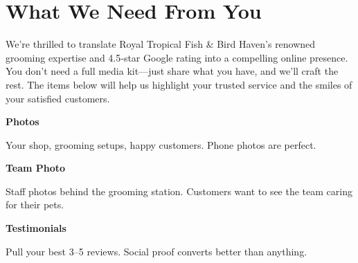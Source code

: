 \documentclass[11pt,letterpaper]{article}
\begin{document}
\vspace{0.2em}

\section*{What We Need From You}

We’re thrilled to translate Royal Tropical Fish \& Bird Haven’s renowned grooming expertise and 4.5‑star Google rating into a compelling online presence. You don’t need a full media kit—just share what you have, and we’ll craft the rest. The items below will help us highlight your trusted service and the smiles of your satisfied customers.

\vspace{0.12em}

\noindent\begin{minipage}[t]{0.48\textwidth}
\begin{tcolorbox}[colframe=accent-teal, boxrule=1pt, left=0.7em, right=0.7em, top=0.5em, bottom=0.5em, arc=4pt, boxsep=0pt]
{\bfseries\small\color{accent-teal}Photos}

\vspace{0.15em}

{\small Your shop, grooming setups, happy customers. Phone photos are perfect.}
\end{tcolorbox}

\vspace{0.1em}

\begin{tcolorbox}[colframe=accent-teal, boxrule=1pt, left=0.7em, right=0.7em, top=0.5em, bottom=0.5em, arc=4pt, boxsep=0pt]
{\bfseries\small\color{accent-teal}Team Photo}

\vspace{0.15em}

{\small Staff photos behind the grooming station. Customers want to see the team caring for their pets.}
\end{tcolorbox}

\vspace{0.1em}

\begin{tcolorbox}[colframe=accent-teal, boxrule=1pt, left=0.7em, right=0.7em, top=0.5em, bottom=0.5em, arc=4pt, boxsep=0pt]
{\bfseries\small\color{accent-teal}Testimonials}

\vspace{0.15em}

{\small Pull your best 3--5 reviews. Social proof converts better than anything.}
\end{tcolorbox}
\end{minipage}
\end{document}
